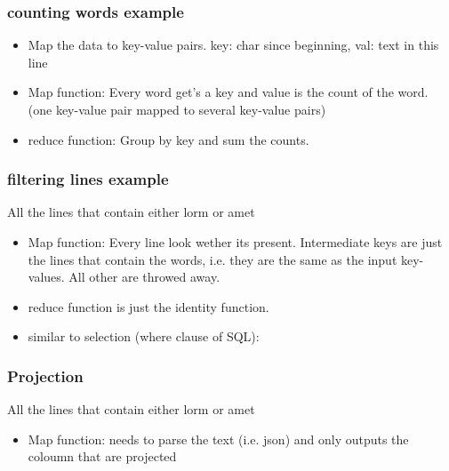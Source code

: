 \subsubsection{counting words example}
\begin{itemize}
    \item Map the data to key-value pairs. key: char since beginning, val: text in this line
    \item Map function: Every word get's a key and value is the count
    of the word. (one key-value pair mapped to several key-value pairs)
    \item reduce function: Group by key and sum the counts.
\end{itemize}
\subsubsection{filtering lines example}
All the lines that contain either lorm or amet
\begin{itemize}
    \item Map function: Every line look wether its present. Intermediate keys are just the lines that contain the words,
    i.e. they are the same as the input key-values. All other are throwed away.
    \item reduce function is just the identity function.
    \item similar to selection (where clause of SQL):
\end{itemize}
\subsubsection{Projection}
All the lines that contain either lorm or amet
\begin{itemize}
    \item Map function: needs to parse the text (i.e. json) and only outputs the coloumn that are projected
\end{itemize}




